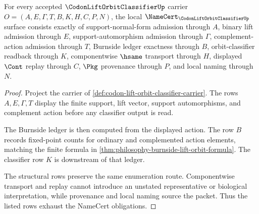 \begin{theorem}
\label{thm:codon-lift-orbit-classifier-namecert-obligations}
For every accepted $\CodonLiftOrbitClassifierUp$ carrier $O=(A,E,\Gamma,T,B,K,H,C,P,N)$, the local $\NameCert_{\CodonLiftOrbitClassifierUp}$ surface consists exactly of support-normal-form admission through $A$, binary lift admission through $E$, support-automorphism admission through $\Gamma$, complement-action admission through $T$, Burnside ledger exactness through $B$, orbit-classifier readback through $K$, componentwise $\hsame$ transport through $H$, displayed $\Cont$ replay through $C$, $\Pkg$ provenance through $P$, and local naming through $N$.
\end{theorem}
\begin{proof}
Project the carrier of \autoref{def:codon-lift-orbit-classifier-carrier}. The rows $A,E,\Gamma,T$ display the finite support, lift vector, support automorphisms, and complement action before any classifier output is read.

The Burnside ledger is then computed from the displayed action. The row $B$ records fixed-point counts for ordinary and complemented action elements, matching the finite formula in \autoref{thm:philosophy-burnside-lift-orbit-formula}. The classifier row $K$ is downstream of that ledger.

The structural rows preserve the same enumeration route. Componentwise transport and replay cannot introduce an unstated representative or biological interpretation, while provenance and local naming source the packet. Thus the listed rows exhaust the NameCert obligations.
\end{proof}

